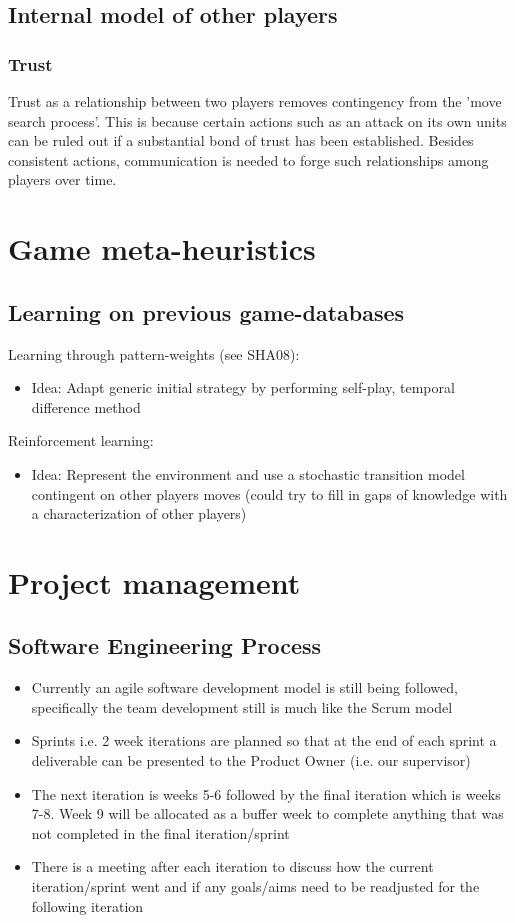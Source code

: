 \documentclass[12pt]{article}
\begin{document}
\subsection{Internal model of other players}

\subsubsection{Trust}

Trust as a relationship between two players removes contingency
from the 'move search process'. This is because certain actions such
as an attack on its own units can be ruled out if a substantial bond of trust
has been established. Besides consistent actions, communication
is needed to forge such relationships among players over time. 

\section{Game meta-heuristics}

\subsection{Learning on previous game-databases}
Learning through pattern-weights (see SHA08):
\begin{itemize}
\item[] Idea: Adapt generic initial strategy by performing 
self-play, temporal difference method
\end{itemize}
Reinforcement learning:
\begin{itemize}
\item[] Idea: Represent the environment and use a stochastic transition model 
contingent on other players moves (could try to fill in gaps of knowledge with 
a characterization of other players)
\end{itemize}

\section{Project management}

\subsection{Software Engineering Process}
\begin{itemize}
\item Currently an agile software development model is still being followed,
specifically the team development still is much like the Scrum model
\item Sprints i.e. 2 week iterations are planned so that at the end of each
sprint a deliverable can be presented to the Product Owner (i.e. our
supervisor)
\item The next iteration is weeks 5-6 followed by the final iteration which
is weeks 7-8. Week 9 will be allocated as a buffer week to complete
anything that was not completed in the final iteration/sprint
\item There is a meeting after each iteration to discuss how the current
iteration/sprint went and if any goals/aims need to be readjusted
for the following iteration
\end{itemize}
\end{document}
